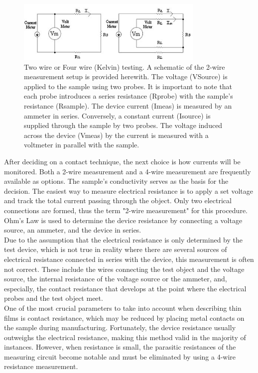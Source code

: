 \begin{figure}[htbp!] 
    \centering    
    \includegraphics[width=0.8\textwidth]{Chapter3/Figs/d.png}
    \caption[Two wire or Four wire (Kelvin) testing.]{Two wire or Four wire (Kelvin) testing. A schematic of the 2-wire measurement setup is provided herewith. The voltage (VSource) is applied to the sample using two probes. It is important to note that each probe introduces a series resistance (Rprobe) with the sample's resistance (Rsample). The device current (Imeas) is measured by an ammeter in series. Conversely, a constant current (Isource) is supplied through the sample by two probes. The voltage induced across the device (Vmeas) by the current is measured with a voltmeter in parallel with the sample.}
    \label{fig:3d}
\end{figure}

\noindent After deciding on a contact technique, the next choice is how currents will be monitored. Both a 2-wire measurement and a 4-wire measurement are frequently available as options. The sample's conductivity serves as the basis for the decision. The easiest way to measure electrical resistance is to apply a set voltage and track the total current passing through the object. Only two electrical connections are formed, thus the term "2-wire measurement" for this procedure. Ohm's Law is used to determine the device resistance by connecting a voltage source, an ammeter, and the device in series. \\

\noindent Due to the assumption that the electrical resistance is only determined by the test device, which is not true in reality where there are several sources of electrical resistance connected in series with the device, this measurement is often not correct. These include the wires connecting the test object and the voltage source, the internal resistance of the voltage source or the ammeter, and, especially, the contact resistance that develops at the point where the electrical probes and the test object meet. \\

\noindent One of the most crucial parameters to take into account when describing thin films is contact resistance, which may be reduced by placing metal contacts on the sample during manufacturing. Fortunately, the device resistance usually outweighs the electrical resistance, making this method valid in the majority of instances. However, when resistance is small, the parasitic resistances of the measuring circuit become notable and must be eliminated by using a 4-wire resistance measurement. \\

